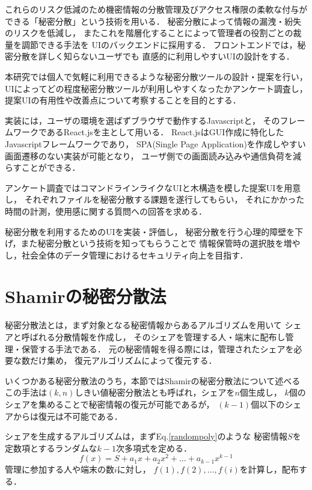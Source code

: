 \documentclass[fleqn, uplatex]{jsarticle}
\begin{document}
これらのリスク低減のため機密情報の分散管理及びアクセス権限の柔軟な付与が%
できる「秘密分散\cite{lit:nishikawa}」という技術を用いる．%
秘密分散によって情報の漏洩・紛失のリスクを低減し，%
またこれを階層化することによって管理者の役割ごとの裁量を調節できる手法を%
UIのバックエンドに採用する．%
フロントエンドでは，秘密分散を詳しく知らないユーザでも%
直感的に利用しやすいUIの設計をする．

本研究では個人で気軽に利用できるような秘密分散ツールの設計・提案を行い，%
UIによってどの程度秘密分散ツールが利用しやすくなったかアンケート調査し，%
提案UIの有用性や改善点について考察することを目的とする．

実装には，ユーザの環境を選ばずブラウザで動作するJavascriptと，%
そのフレームワークであるReact.jsを主として用いる．%
React.jsはGUI作成に特化したJavascriptフレームワークであり，%
SPA(Single Page Application)を作成しやすい画面遷移のない実装が可能となり，%
ユーザ側での画面読み込みや通信負荷を減らすことができる．

アンケート調査ではコマンドラインライクなUIと木構造を模した提案UIを用意し，
それぞれファイルを秘密分散する課題を遂行してもらい，%
それにかかった時間の計測，使用感に関する質問への回答を求める．

秘密分散を利用するためのUIを実装・評価し，%
秘密分散を行う心理的障壁を下げ，また秘密分散という技術を知ってもらうことで%
情報保管時の選択肢を増やし，社会全体のデータ管理におけるセキュリティ向上を目指す．

\section{Shamirの秘密分散法}
秘密分散法とは，まず対象となる秘密情報からあるアルゴリズムを用いて%
シェアと呼ばれる分散情報を作成し，%
そのシェアを管理する人・端末に配布し管理・保管する手法である．%
元の秘密情報を得る際には，管理されたシェアを必要な数だけ集め，%
復元アルゴリズムによって復元する．

いくつかある秘密分散法のうち，本節ではShamirの秘密分散法\cite{lit:shamir}について述べる%
この手法は$(k,n)$しきい値秘密分散法とも呼ばれ，シェアを$n$個生成し，%
$k$個のシェアを集めることで秘密情報の復元が可能であるが，%
$(k-1)$個以下のシェアからは復元は不可能である．

シェアを生成するアルゴリズムは，まずEq.\ref{randompoly}のような%
秘密情報$S$を定数項とするランダムな$k-1$次多項式を定める．
%
\begin{equation}
f(x) = S + a_{1}x + a_{2}x^{2} + \dots + a_{k-1}x^{k-1} \label{randompoly}
\end{equation}
%
管理に参加する人や端末の数$i$に対し，%
$f(1),f(2),\dots,f(i)$を計算し，配布する．
\end{document}
